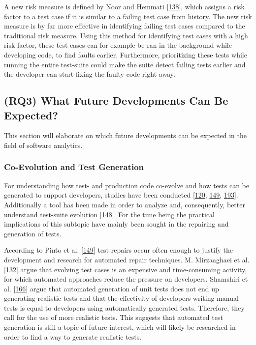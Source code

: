 \documentclass[]{book}
\begin{document}
A new risk measure is defined by Noor and Hemmati
{[}\protect\hyperlink{ref-noor2015test}{138}{]}, which assigns a risk
factor to a test case if it is similar to a failing test case from
history. The new risk measure is by far more effective in identifying
failing test cases compared to the traditional risk measure. Using this
method for identifying test cases with a high risk factor, these test
cases can for example be ran in the background while developing code, to
find faults earlier. Furthermore, prioritizing these tests while running
the entire test-suite could make the suite detect failing tests earlier
and the developer can start fixing the faulty code right away.

\subsection{(RQ3) What Future Developments Can Be
Expected?}\label{rq3-what-future-developments-can-be-expected}

This section will elaborate on which future developments can be expected
in the field of software analytics.

\subsubsection{Co-Evolution and Test
Generation}\label{co-evolution-and-test-generation}

For understanding how test- and production code co-evolve and how tests
can be generated to support developers, studies have been conducted
{[}\protect\hyperlink{ref-marsavina2014}{120},
\protect\hyperlink{ref-pinto2012understanding}{149},
\protect\hyperlink{ref-zaidman2011studying}{193}{]}. Additionally a tool
has been made in order to analyze and, consequently, better understand
test-suite evolution {[}\protect\hyperlink{ref-pinto2013}{148}{]}. For
the time being the practical implications of this subtopic have mainly
been sought in the repairing and generation of tests.

According to Pinto et al.
{[}\protect\hyperlink{ref-pinto2012understanding}{149}{]} test repairs
occur often enough to justify the development and research for automated
repair techniques. M. Mirzaaghaei et al.
{[}\protect\hyperlink{ref-supportingtestsuite}{132}{]} argue that
evolving test cases is an expensive and time-consuming activity, for
which automated approaches reduce the pressure on developers. Shamshiri
et al. {[}\protect\hyperlink{ref-shamshiri2018automatically}{166}{]}
argue that automated generation of unit tests does not end up generating
realistic tests and that the effectivity of developers writing manual
tests is equal to developers using automatically generated tests.
Therefore, they call for the use of more realistic tests. This suggests
that automated test generation is still a topic of future interest,
which will likely be researched in order to find a way to generate
realistic tests.
\end{document}
